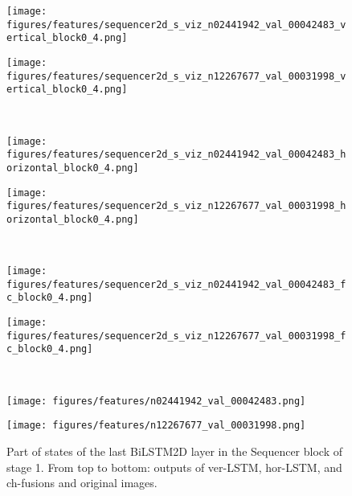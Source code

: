 \documentclass{article}
\begin{document}
\begin{figure}[ht]
\begin{minipage}[t]{0.75\textwidth}
    \label{figure:resolution_adaptability_efficiency}
\end{minipage}
\begin{minipage}[t]{0.23\textwidth}
\vspace{0pt}
\centering
  \centering
    \begin{minipage}[h]{0.48\hsize}
    \centering
    \texttt{[image: figures/features/sequencer2d\_s\_viz\_n02441942\_val\_00042483\_vertical\_block0\_4.png]}
  \end{minipage}
    \begin{minipage}[h]{0.48\hsize}
    \centering
    \texttt{[image: figures/features/sequencer2d\_s\_viz\_n12267677\_val\_00031998\_vertical\_block0\_4.png]}
  \end{minipage}
  \\ \vspace{1.5ex}
    \begin{minipage}[h]{0.48\hsize}
    \centering
    \texttt{[image: figures/features/sequencer2d\_s\_viz\_n02441942\_val\_00042483\_horizontal\_block0\_4.png]}
  \end{minipage}
    \begin{minipage}[h]{0.48\hsize}
    \centering
    \texttt{[image: figures/features/sequencer2d\_s\_viz\_n12267677\_val\_00031998\_horizontal\_block0\_4.png]}
  \end{minipage}
  \\ \vspace{1.5ex}
      \begin{minipage}[h]{0.48\hsize}
    \centering
    \texttt{[image: figures/features/sequencer2d\_s\_viz\_n02441942\_val\_00042483\_fc\_block0\_4.png]}
  \end{minipage}
      \begin{minipage}[h]{0.48\hsize}
    \centering
    \texttt{[image: figures/features/sequencer2d\_s\_viz\_n12267677\_val\_00031998\_fc\_block0\_4.png]}
  \end{minipage}
  \\ \vspace{1.5ex}
  \begin{minipage}[h]{0.48\hsize}
    \centering
    \texttt{[image: figures/features/n02441942\_val\_00042483.png]}
  \end{minipage}
  \begin{minipage}[h]{0.48\hsize}
    \centering
    \texttt{[image: figures/features/n12267677\_val\_00031998.png]}
  \end{minipage} \vspace{0.2ex}
  \caption{Part of states of the last BiLSTM2D layer in the Sequencer block of stage 1. From top to bottom: outputs of ver-LSTM, hor-LSTM, and ch-fusions and original images.}
  \label{figure:viz_lstm}
\end{minipage}
\end{figure}
\end{document}
